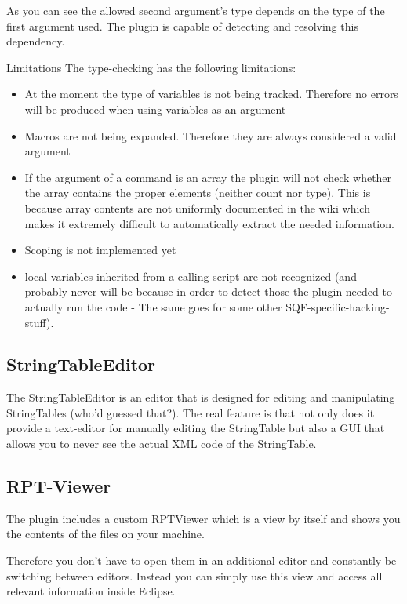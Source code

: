 \documentclass[twoside=false]{scrbook}
\newcommand{\eclipse}{Eclipse\xspace}
\newcommand{\view}[1]{#1}
\begin{document}
	As you can see the allowed second argument's type depends on the type of the first argument used. The plugin is capable of detecting and resolving this dependency.
	
	\begin{info}{Limitations}
		The type-checking has the following limitations:
		\begin{itemize}
			\item At the moment the type of variables is not being tracked. Therefore no errors will be produced when using variables as an argument
			\item Macros are not being expanded. Therefore they are always considered a valid argument
			\item If the argument of a command is an array the plugin will not check whether the array contains the proper elements (neither count nor type). This is because array contents are not uniformly documented in the wiki which makes it extremely difficult to automatically extract the needed information.
			\item Scoping is not implemented yet
			\item local variables inherited from a calling script are not recognized (and probably never will be because in order to detect those the plugin needed to actually run the code - The same goes for some other SQF-specific-hacking-stuff).
		\end{itemize}
	\end{info}
	
	
	\subsection{StringTableEditor}
	\label{ssec:StringTableEditor}
	
	The StringTableEditor is an editor that is designed for editing and manipulating StringTables (who'd guessed that?). The real feature is that not only does it provide a text-editor for manually editing the StringTable but also a GUI that allows you to never see the actual XML code of the StringTable.
	
	
	\subsection{RPT-Viewer}
	The plugin includes a custom \view{RPTViewer} which is a view by itself and shows you the contents of the  files on your machine.
	
	Therefore you don't have to open them in an additional editor and constantly be switching between editors. Instead you can simply use this view and access all relevant information inside \eclipse.
	
\end{document}
